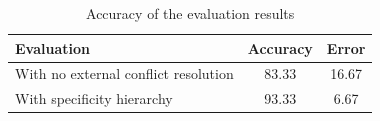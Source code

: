 \documentclass[a4paper,11pt,twoside,openright]{report}
\begin{document}
\begin{table}[h]
{\begin{subtable}[t]{3in}
\caption{Accuracy of the evaluation results}
\begin{tabular}{|l|c|c|}
\hline
Evaluation                           & \multicolumn{1}{l|}{Accuracy} & \multicolumn{1}{l|}{Error} \\ \hline
With no external conflict resolution & 83.33                         & 16.67                      \\ \hline
With specificity hierarchy           & 93.33                         & 6.67                       \\ \hline
\end{tabular}
	\end{subtable}

}
\end{table}
\end{document}

